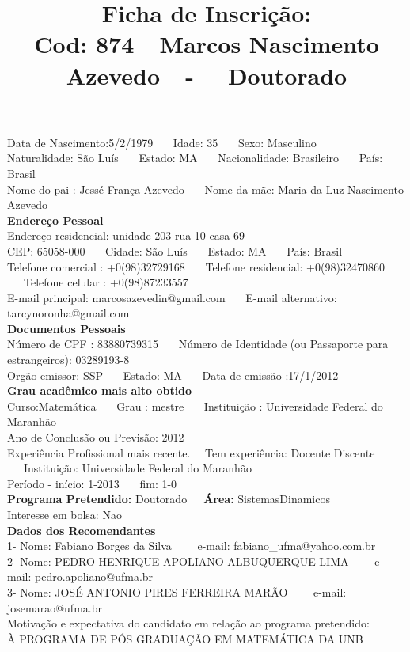 \documentclass[11pt]{article}
\title{\vspace*{-4cm} Ficha de Inscrição: \\Cod: 874\ \ Marcos  Nascimento Azevedo\ \ - \ \ Doutorado 
 }
\date{}
\begin{document}
\maketitle
\vspace*{-1.5cm}
\noindent Data de Nascimento:5/2/1979
\ \ \ Idade: 35   \ \ \ Sexo: Masculino
\\
Naturalidade: São Luís  
\ \ \  Estado: MA
\ \ \  Nacionalidade: Brasileiro
\ \ \ País: Brasil
\\        
Nome do pai : Jessé França Azevedo
\ \ \ Nome da mãe: Maria da Luz Nascimento Azevedo          
\\[0.2cm]                     
\textbf{Endereço Pessoal} 
\\ 
\noindent Endereço residencial: unidade 203 rua 10 casa 69
\\
        CEP: 65058-000 
\ \ \ Cidade: São Luís 
\ \ \ Estado: MA 
\ \ \ País: Brasil
\\		
		Telefone comercial : +0(98)32729168
\ \ \ Telefone residencial: +0(98)32470860
\ \ \ Telefone celular : +0(98)87233557
\\
E-mail principal: marcosazevedin@gmail.com
\ \ \ E-mail alternativo: tarcynoronha@gmail.com 
\\[0.2cm] 
\textbf{Documentos Pessoais}
\\
\noindent Número de CPF : 83880739315
\ \ \ Número de Identidade (ou Passaporte para estrangeiros): 03289193-8
\\
Orgão emissor: SSP
\ \ \ Estado: MA
\ \ \ Data de emissão :17/1/2012
\\[0.3cm]
\textbf{Grau acadêmico mais alto obtido}
\\	
Curso:Matemática
\ \ \ Grau : mestre
\ \ \ Instituição : Universidade Federal do Maranhão
\\			
Ano de Conclusão ou Previsão: 2012
\\ 
Experiência Profissional mais recente. \ \  
Tem experiência: Docente Discente  
\ \ \ Instituição: Universidade Federal do Maranhão
\\  
Período - início: 1-2013
\ \ \ fim: 1-0
\\[0.2cm] 
\textbf{Programa Pretendido:} Doutorado\ \ \ \textbf{Área:} SistemasDinamicos\\
Interesse em bolsa: Nao
\\[0.3cm]		
\textbf{Dados dos Recomendantes} 
\\
1- Nome: Fabiano Borges da Silva
\ \ \ \  e-mail: fabiano\_ufma@yahoo.com.br 
\\
2- Nome: PEDRO HENRIQUE APOLIANO ALBUQUERQUE LIMA
\ \ \ \ e-mail: pedro.apoliano@ufma.br
\\
3- Nome: JOSÉ ANTONIO PIRES FERREIRA MARÃO
\ \ \ \ e-mail: josemarao@ufma.br
\\[0.2cm]
Motivação e expectativa do candidato em relação ao programa pretendido:
\\À PROGRAMA DE PÓS GRADUAÇÃO EM MATEMÁTICA DA UNB
\end{document}
